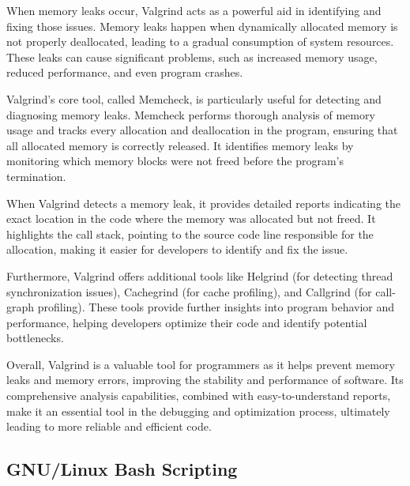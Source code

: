 \documentclass[12pt]{article}
\begin{document}
When memory leaks occur, Valgrind acts as a powerful aid in identifying and fixing those issues. Memory leaks happen when dynamically allocated memory is not properly deallocated, leading to a gradual consumption of system resources. These leaks can cause significant problems, such as increased memory usage, reduced performance, and even program crashes.



Valgrind's core tool, called Memcheck, is particularly useful for detecting and diagnosing memory leaks. Memcheck performs thorough analysis of memory usage and tracks every allocation and deallocation in the program, ensuring that all allocated memory is correctly released. It identifies memory leaks by monitoring which memory blocks were not freed before the program's termination.



When Valgrind detects a memory leak, it provides detailed reports indicating the exact location in the code where the memory was allocated but not freed. It highlights the call stack, pointing to the source code line responsible for the allocation, making it easier for developers to identify and fix the issue.



Furthermore, Valgrind offers additional tools like Helgrind (for detecting thread synchronization issues), Cachegrind (for cache profiling), and Callgrind (for call-graph profiling). These tools provide further insights into program behavior and performance, helping developers optimize their code and identify potential bottlenecks.



Overall, Valgrind is a valuable tool for programmers as it helps prevent memory leaks and memory errors, improving the stability and performance of software. Its comprehensive analysis capabilities, combined with easy-to-understand reports, make it an essential tool in the debugging and optimization process, ultimately leading to more reliable and efficient code.

\subsection{GNU/Linux Bash Scripting}
\end{document}
